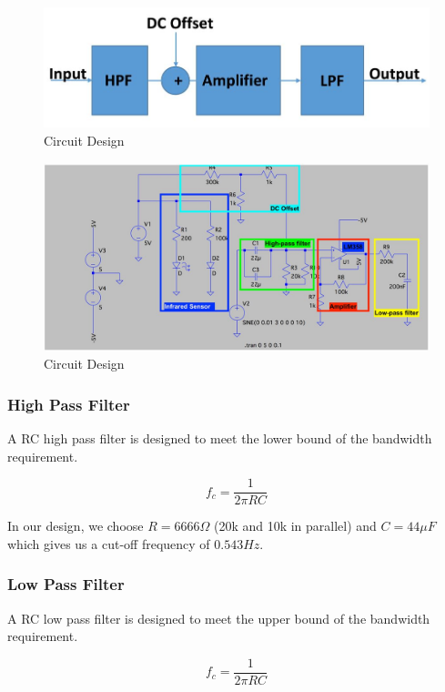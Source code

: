 \begin{figure}[H]
	\centering
	\includegraphics[width=0.8\linewidth]{georgepic3.jpg}
	\caption{Circuit Design}
\end{figure}

\begin{figure}[H]
	\centering
	\includegraphics[width=0.9\linewidth]{georgepic4.jpg}
	\caption{Circuit Design}
\end{figure}

\subsubsection{High Pass Filter}

A RC high pass filter is designed to meet the lower bound of the bandwidth requirement.

\begin{equation}
	f_c = \frac{1}{2\pi RC}
\end{equation}

In our design, we choose $R = 6666 \Omega$ (20k and 10k in parallel) and $C = 44 \mu F$ which gives us a cut-off frequency of $0.543 Hz$.

\subsubsection{Low Pass Filter}

A RC low pass filter is designed to meet the upper bound of the bandwidth requirement.

\begin{equation}
f_c = \frac{1}{2\pi RC}
\end{equation}

